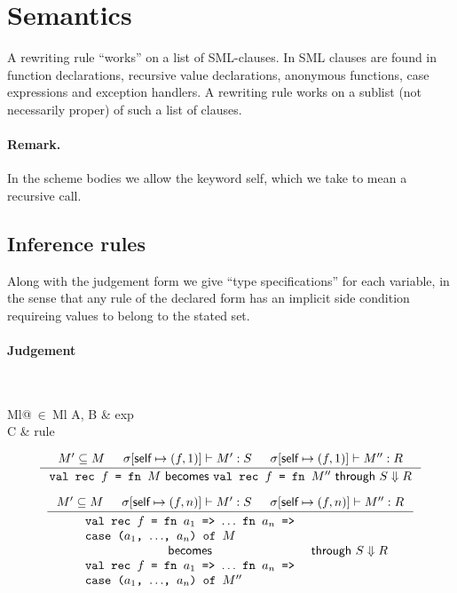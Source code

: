 \section{Semantics}
A rewriting rule ``works'' on a list of SML-clauses. In SML clauses are found in
function declarations, recursive value declarations, anonymous functions, case
expressions and exception handlers. A rewriting rule works on a sublist (not
necessarily proper) of such a list of clauses.

\paragraph{Remark.} In the scheme bodies we allow the keyword \textsf{self},
which we take to mean a recursive call.

\subsection{Inference rules}
\newcommand{\becomesthrough}[3]{#1 \textsf{ becomes } #2 \textsf{ through } #3}

Along with the judgement form we give ``type specifications'' for each variable,
in the sense that any rule of the declared form has an implicit side condition
requireing values to belong to the stated set.

\paragraph{Judgement} \fbox{\becomesthrough{A}{B}{C}}\\
\indent\begin{tabular}{Ml@{$\ \in\ $}Ml}
  A, B & exp\\
  C & rule
\end{tabular}

\[
\inference
{
  M' \subseteq M &
  \sigma[\textsf{self} \mapsto (f, 1)] |- M' : S &
  \sigma[\textsf{self} \mapsto (f, 1)] |- M'' : R
}
{
  \becomesthrough
  {\texttt{val rec $f$ = fn $M$}}
  {\texttt{val rec $f$ = fn $M''$}}
  {S \Downarrow R}
}
\]

\[
\inference
{
  M' \subseteq M &
  \sigma[\textsf{self} \mapsto (f, n)] |- M' : S &
  \sigma[\textsf{self} \mapsto (f, n)] |- M'' : R
}
{
  \begin{array}{c}
    \begin{array}{l}
      \texttt{val rec $f$ = fn $a_1$ => $\ldots$ fn $a_n$ =>}\\
      \texttt{case ($a_1$, $\ldots$, $a_n$) of $M$}
    \end{array}\\
    \textsf{becomes}\\
    \begin{array}{l}
      \texttt{val rec $f$ = fn $a_1$ => $\ldots$ fn $a_n$ =>}\\
      \texttt{case ($a_1$, $\ldots$, $a_n$) of $M''$}
    \end{array}
  \end{array}
  \textsf{ through }
  S \Downarrow R
}
\]

